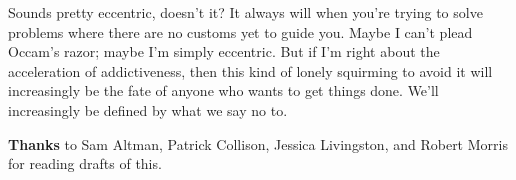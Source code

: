 Sounds pretty eccentric, doesn't it? It always will when you're trying
to solve problems where there are no customs yet to guide you. Maybe I
can't plead Occam's razor; maybe I'm simply eccentric. But if I'm right
about the acceleration of addictiveness, then this kind of lonely
squirming to avoid it will increasingly be the fate of anyone who wants
to get things done. We'll increasingly be defined by what we say no to.


\textbf{Thanks} to Sam Altman, Patrick Collison, Jessica Livingston, and
Robert Morris for reading drafts of this.